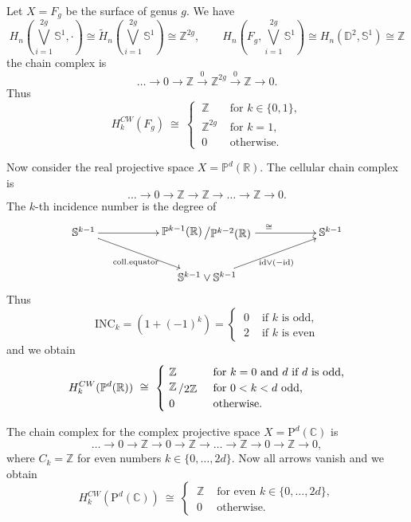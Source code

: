 \documentclass[11pt]{book}
\numberwithin{dummy}{section}
\theoremstyle{nonumberbreak}
\newenvironment{ex}[1][]{\ifthenelse{\equal{#1}{}}{\example}{\example[#1]}\rm}{\endexample}
\newcommand{\Sph}{\mathbb{S}}
\newcommand{\la}{\longrightarrow}
\newcommand{\id}{\mathrm{id}}
\newcommand{\Z}{\mathbb{Z}}
\newcommand{\slant}[2]{{\raisebox{.1em}{$#1$}\left/\raisebox{-.1em}{$#2$}\right.}}
\begin{document}
\begin{spacing}{1.4}
\begin{ex}
\begin{compactenum}
\item Let $X=F_g$ be the surface of genus $g$. We have 
$$H_n\left( \bigvee_{i=1}^{2g} \Sph^1, \cdot\right) \cong \tilde{H}_n\left( \bigvee_{i=1}^{2g} \Sph^1\right) \cong \Z^{2g}, \qquad H_n\left( F_g, \bigvee_{i=1}^{2g} \Sph^1\right) \cong H_n(\mathbb{D}^2, \Sph^1) \cong \Z$$
the chain complex is 
$$\ldots \la 0 \la \Z \overset{0}{\la} \Z^{2g} \overset{0}{\la} \Z \la 0.$$
Thus 
$$H_k^{CW}(F_g) \ \cong \ \begin{cases} \ \Z & \textrm{ for }k \in \{0,1\}, \\ \ \Z^{2g} & \textrm{ for } k=1, \\ \ 0 & \textrm{ otherwise. } \end{cases} $$

\item Now consider the real projective space $X= \mathbb{P}^d(\mathbb{R})$. The cellular chain complex is
$$\ldots \la 0 \la \Z \la \Z \la \ldots \la \Z \la 0.$$
The $k$-th incidence number is the degree of 
$$
\begin{xy}
\xymatrix{
\Sph^{k-1} \ar[rrd]_{\mathrm{coll. equator}} \ar[rr] && \slant{\mathbb{P}^{k-1}(\mathbb{R})}{\mathbb{P}^{k-2}(\mathbb{R})} \ar[rr]^{\cong} &&\Sph^{k-1} \\
&& \Sph^{k-1} \vee \Sph^{k-1} \ar[rru]_{\id \vee (-\id)} &&
}
\end{xy}
$$
Thus 
$$\mathrm{INC}_k= (1+ (-1)^k) = \begin{cases} \ 0 & \textrm{ if } k \textrm{ is odd,} \\ \ 2 & \textrm{ if } k \textrm{ is even} \end{cases} $$
and we obtain 
$$H_k^{CW}(\mathbb{P}^d(\mathbb{R})) \ \cong \ \begin{cases} \ \Z & \textrm{ for } k=0 \textrm{ and } d \textrm{ if } d \textrm{ is odd,} \\ \ \slant{\Z}{2\Z} & \textrm{ for  } 0 <k <d \textrm{ odd,} \\ \ 0 & \textrm{ otherwise.} \end{cases} $$

\item The chain complex for the complex projective space $X= \mathrm{P}^d(\mathbb{C})$ is 
$$\ldots \la 0 \la \Z \la 0 \la \Z \la \ldots \la \Z \la 0 \la \Z \la 0,$$
where $C_k=\Z$ for even numbers $k \in \{0, \ldots, 2d\}$. Now all arrows vanish and we obtain 
$$H_k^{CW}(\mathrm{P}^d(\mathbb{C})) \ \cong \ \begin{cases} \ \Z & \textrm{ for even }k \in  \{0,\ldots, 2d\}, \\ \ 0 & \textrm{ otherwise.} \end{cases} $$


\end{compactenum}
\end{ex}
\end{spacing}
\end{document}
